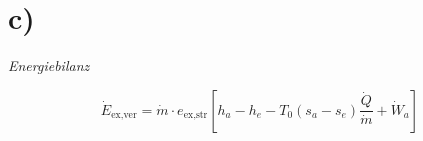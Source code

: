 

\section*{c)}
\textit{Energiebilanz}

\[
\dot{E}_{\text{ex,ver}} = \dot{m} \cdot e_{\text{ex,str}} \left[ h_a - h_e - T_0 (s_a - s_e) \frac{\dot{Q}}{\dot{m}} + \dot{W}_a \right]
\]